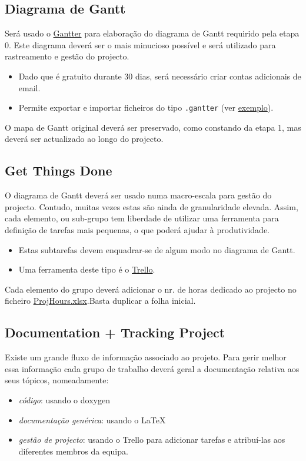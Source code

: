 \documentclass[11pt]{article}
\begin{document}
\subsection{Diagrama de Gantt}
\label{sec:orgee1b3c6}
Será usado o \href{https://www.gantter.com/}{Gantter} para elaboração do diagrama de Gantt requirido pela
etapa 0. Este diagrama deverá ser o mais minucioso possível e será utilizado
para rastreamento e gestão do projecto.
\begin{itemize}
\item Dado que é gratuito durante 30 dias, será necessário criar contas adicionais
de email.
\item Permite exportar e importar ficheiros do tipo \texttt{.gantter} (ver \href{sec/examples/PL2.gantter}{exemplo}).
\end{itemize}

O mapa de Gantt original deverá ser preservado, como constando da etapa 1, mas
deverá ser actualizado ao longo do projecto.
\subsection{Get Things Done}
\label{sec:org745fc98}
O diagrama de Gantt deverá ser usado numa macro-escala para gestão do projecto.
Contudo, muitas vezes estas são ainda de granularidade elevada. Assim, cada
elemento, ou sub-grupo tem liberdade de utilizar uma ferramenta para definição
de tarefas mais pequenas, o que poderá ajudar à produtividade.
\begin{itemize}
\item Estas subtarefas devem enquadrar-se de algum modo no diagrama de Gantt.
\item Uma ferramenta deste tipo é o \href{https://trello.com/}{Trello}.
\end{itemize}

Cada elemento do grupo deverá adicionar o nr. de horas dedicado ao projecto
no ficheiro \href{ProjManag/ProjHours.xlsx}{ProjHours.xlsx}.Basta duplicar a folha inicial.
\subsection{Documentation + Tracking Project}
\label{sec:orgac9a1b9}
Existe um grande fluxo de informação associado ao projeto. Para gerir melhor
essa informação cada grupo de trabalho deverá geral a documentação relativa aos
seus tópicos, nomeadamente:
\begin{itemize}
\item \emph{código}: usando o doxygen
\item \emph{documentação genérica}: usando o \LaTeX{}
\item \emph{gestão de projecto}: usando o Trello para adicionar tarefas e atribuí-las aos
diferentes membros da equipa.
\end{itemize}
\end{document}
